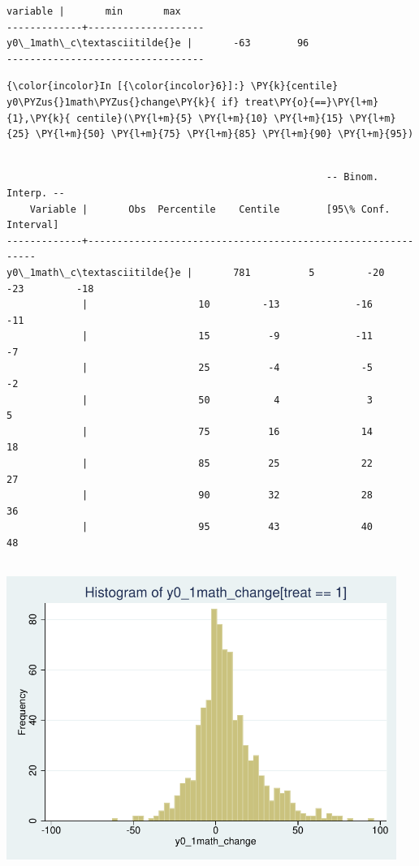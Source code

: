 \documentclass[11pt,notitlepage]{article}\usepackage[]{graphicx}\usepackage[]{color}
\makeatletter
\newenvironment{kframe}{%
 \def\at@end@of@kframe{}%
 \ifinner\ifhmode%
  \def\at@end@of@kframe{\end{minipage}}%
  \begin{minipage}{\columnwidth}%
 \fi\fi%
 \def\FrameCommand##1{\hskip\@totalleftmargin \hskip-\fboxsep
 \colorbox{shadecolor}{##1}\hskip-\fboxsep
     \hskip-\linewidth \hskip-\@totalleftmargin \hskip\columnwidth}%
 \MakeFramed {\advance\hsize-\width
   \@totalleftmargin\z@ \linewidth\hsize
   \@setminipage}}%
 {\par\unskip\endMakeFramed%
 \at@end@of@kframe}
\newenvironment{knitrout}{}{} %
\makeatother
\begin{document}
\begin{enumerate}[a)]
\begin{knitrout}
\begin{kframe}
\begin{Verbatim}[commandchars=\\\{\}]
    variable |       min       max
-------------+--------------------
y0\_1math\_c\textasciitilde{}e |       -63        96
----------------------------------

    \end{Verbatim}

    \begin{Verbatim}[commandchars=\\\{\}]
{\color{incolor}In [{\color{incolor}6}]:} \PY{k}{centile} y0\PYZus{}1math\PYZus{}change\PY{k}{ if} treat\PY{o}{==}\PY{l+m}{1},\PY{k}{ centile}(\PY{l+m}{5} \PY{l+m}{10} \PY{l+m}{15} \PY{l+m}{25} \PY{l+m}{50} \PY{l+m}{75} \PY{l+m}{85} \PY{l+m}{90} \PY{l+m}{95})
\end{Verbatim}

    \begin{Verbatim}[commandchars=\\\{\}]

                                                       -- Binom. Interp. --
    Variable |       Obs  Percentile    Centile        [95\% Conf. Interval]
-------------+-------------------------------------------------------------
y0\_1math\_c\textasciitilde{}e |       781          5         -20             -23         -18
             |                   10         -13             -16         -11
             |                   15          -9             -11          -7
             |                   25          -4              -5          -2
             |                   50           4               3           5
             |                   75          16              14          18
             |                   85          25              22          27
             |                   90          32              28          36
             |                   95          43              40          48

    \end{Verbatim}
\end{kframe}


{\centering \includegraphics[width=5in,height=4in]{figure/PS12-unnamed-chunk-4-1} 

}
\end{knitrout}
\end{enumerate}
\end{document}
